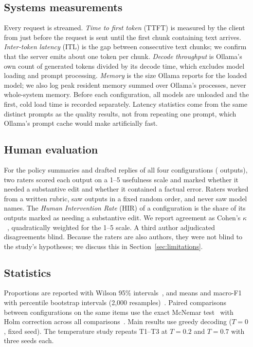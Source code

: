 \documentclass[sigconf,nonacm]{acmart}
\begin{document}
\subsection{Systems measurements}
Every request is streamed.
\emph{Time to first token} (TTFT) is measured by the client from just before the request is sent until the first chunk containing text arrives.
\emph{Inter-token latency} (ITL) is the gap between consecutive text chunks; we confirm that the server emits about one token per chunk.
\emph{Decode throughput} is Ollama's own count of generated tokens divided by its decode time, which excludes model loading and prompt processing.
\emph{Memory} is the size Ollama reports for the loaded model; we also log peak resident memory summed over Ollama's processes, never whole-system memory.
Before each configuration, all models are unloaded and the first, cold load time is recorded separately.
Latency statistics come from the same distinct prompts as the quality results, not from repeating one prompt, which Ollama's prompt cache would make artificially fast.

\subsection{Human evaluation}
For the policy summaries and drafted replies of all four configurations (\NRated{} outputs), two raters scored each output on a 1--5 usefulness scale and marked whether it needed a substantive edit and whether it contained a factual error.
Raters worked from a written rubric, saw outputs in a fixed random order, and never saw model names.
The \emph{Human Intervention Rate} (HIR) of a configuration is the share of its outputs marked as needing a substantive edit.
We report agreement as Cohen's $\kappa$~\cite{cohen1960kappa}, quadratically weighted for the 1--5 scale.
A third author adjudicated disagreements blind.
Because the raters are also authors, they were not blind to the study's hypotheses; we discuss this in Section~\ref{sec:limitations}.

\subsection{Statistics}
Proportions are reported with Wilson 95\% intervals~\cite{wilson1927}, and means and macro-F1 with percentile bootstrap intervals (2,000 resamples)~\cite{efron1993bootstrap}.
Paired comparisons between configurations on the same items use the exact McNemar test~\cite{mcnemar1947} with Holm correction across all comparisons~\cite{holm1979}.
Main results use greedy decoding ($T=0$, fixed seed).
The temperature study repeats T1--T3 at $T=0.2$ and $T=0.7$ with three seeds each.
\end{document}
